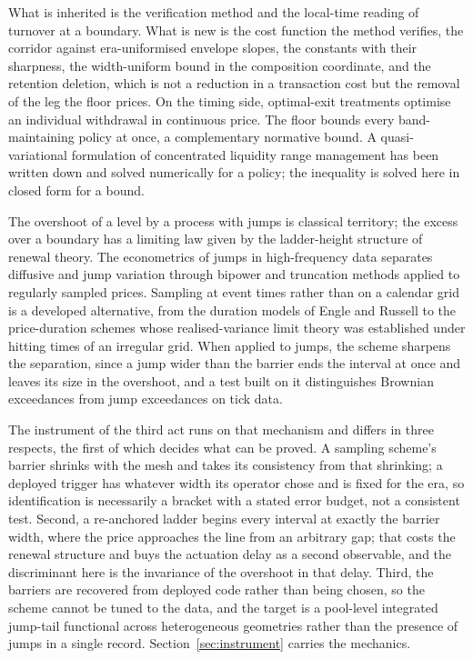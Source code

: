 \documentclass[11pt,a4paper]{article}
\theoremstyle{definition}
\theoremstyle{plain}
\theoremstyle{remark}
\begin{document}
What is inherited is the verification method and the local-time reading of turnover at a boundary. What is new is the cost function the method verifies, the corridor against era-uniformised 
envelope slopes, the constants with their sharpness, the width-uniform bound in the composition coordinate, and the retention deletion, which is not a reduction in a transaction cost but the 
removal of the leg the floor prices. On the timing side, optimal-exit treatments\cite{agarwalgobet2025,bergault2025} optimise an individual withdrawal in continuous price. The floor bounds 
every band-maintaining policy at once, a complementary normative bound. A quasi-variational formulation of concentrated liquidity range management has been written down and solved numerically 
for a policy\cite{anchuri2026}; the inequality is solved here in closed form for a bound.

The overshoot of a level by a process with jumps is classical territory; the excess over a boundary has a limiting law given by the ladder-height structure of renewal theory.\cite{lorden1970,asmussen2003} 
The econometrics of jumps in high-frequency data separates diffusive and jump variation through bipower and truncation methods\cite{bns2004,aitsahalia2014} applied to regularly sampled prices. 
Sampling at event times rather than on a calendar grid is a developed alternative, from the duration models of Engle and Russell\cite{englerussell1998} to the price-duration schemes whose 
realised-variance limit theory was established under hitting times of an irregular grid.\cite{fukasawarosenbaum2012,hong2023} When applied to jumps, the scheme sharpens the separation, 
since a jump wider than the barrier ends the interval at once and leaves its size in the overshoot, and a test built on it distinguishes Brownian exceedances from jump exceedances on tick 
data.\cite{li2026jumps}

The instrument of the third act runs on that mechanism and differs in three respects, the first of which decides what can be proved. A sampling scheme's barrier shrinks with the mesh and takes its
consistency from that shrinking; a deployed trigger has whatever width its operator chose and is fixed for the era, so identification is necessarily a bracket with a stated error budget, not a 
consistent test. Second, a re-anchored ladder begins every interval at exactly the barrier width, where the price approaches the line from an arbitrary gap; that costs the renewal structure and buys 
the actuation delay as a second observable, and the discriminant here is the invariance of the overshoot in that delay. Third, the barriers are recovered from deployed code rather than being chosen, 
so the scheme cannot be tuned to the data, and the target is a pool-level integrated jump-tail functional across heterogeneous geometries rather than the presence of jumps in a single record.
Section~\ref{sec:instrument} carries the mechanics.
\end{document}
